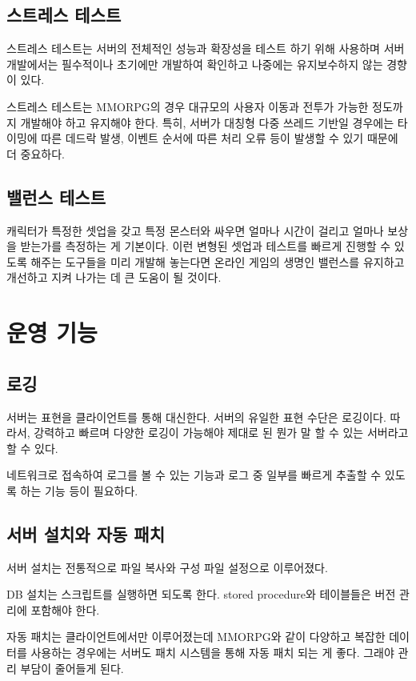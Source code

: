 \documentclass[chapter,kosection, 10.5pt, romanfixed, a4paper]{oblivoir}
\begin{document}
\subsection{스트레스 테스트}

스트레스 테스트는 서버의 전체적인 성능과 확장성을 테스트 하기 위해 사용하며 
서버 개발에서는 필수적이나 초기에만 개발하여 확인하고 나중에는 유지보수하지 
않는 경향이 있다. 

스트레스 테스트는 MMORPG의 경우 대규모의 사용자 이동과 전투가 가능한 정도까지 
개발해야 하고 유지해야 한다. 특히, 서버가 대칭형 다중 쓰레드 기반일 경우에는
타이밍에 따른 데드락 발생, 이벤트 순서에 따른 처리 오류 등이 발생할 수 있기 
때문에 더 중요하다. 

\subsection{밸런스 테스트}

캐릭터가 특정한 셋업을 갖고 특정 몬스터와 싸우면 얼마나 시간이 걸리고 얼마나 보상을 
받는가를 측정하는 게 기본이다. 이런 변형된 셋업과 테스트를 빠르게 진행할 수 있도록 
해주는 도구들을 미리 개발해 놓는다면 온라인 게임의 생명인 밸런스를 유지하고 개선하고 
지켜 나가는 데 큰 도움이 될 것이다. 


\section{운영 기능}

\subsection{로깅}

서버는 표현을 클라이언트를 통해 대신한다. 서버의 유일한 표현 수단은 로깅이다. 
따라서, 강력하고 빠르며 다양한 로깅이 가능해야 제대로 된 뭔가 말 할 수 있는
서버라고 할 수 있다. 

네트워크로 접속하여 로그를 볼 수 있는 기능과 로그 중 일부를 빠르게 추출할 수 
있도록 하는 기능 등이 필요하다. 

\subsection{서버 설치와 자동 패치}

서버 설치는 전통적으로 파일 복사와 구성 파일 설정으로 이루어졌다. 

DB 설치는 스크립트를 실행하면 되도록 한다. stored procedure와 테이블들은
버전 관리에 포함해야 한다. 

자동 패치는 클라이언트에서만 이루어졌는데 MMORPG와 같이 다양하고 복잡한 데이터를
사용하는 경우에는 서버도 패치 시스템을 통해 자동 패치 되는 게 좋다. 그래야 관리 부담이 줄어들게 된다. 
\end{document}

